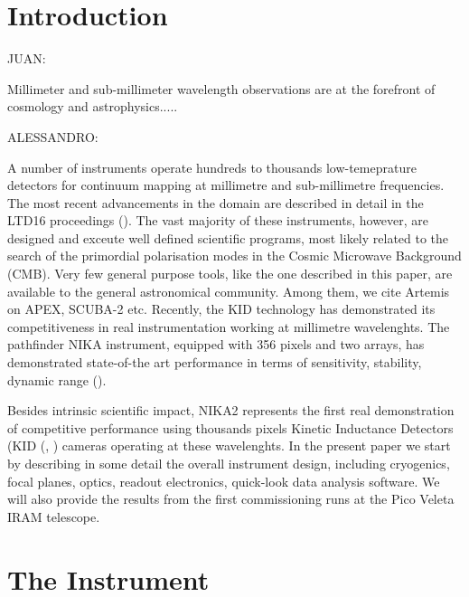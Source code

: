 \documentclass[]{aa} %
\begin{document}
   \maketitle
%

\section{Introduction}

JUAN:

Millimeter and sub-millimeter wavelength observations are at the forefront of cosmology and astrophysics.....  

ALESSANDRO: 

A number of instruments operate hundreds to thousands low-temeprature detectors for continuum mapping at millimetre and sub-millimetre frequencies. The most recent advancements in the domain are described in detail in the LTD16 proceedings (\cite{ltd16:2016}). The vast majority of these instruments, however, are designed and exceute well defined scientific programs, most likely related to the search of the primordial polarisation modes in the Cosmic Microwave Background (CMB). Very few general purpose tools, like the one described in this paper, are available to the general astronomical community. Among them, we cite Artemis on APEX, SCUBA-2 etc. Recently, the KID technology has demonstrated its competitiveness in real instrumentation working at millimetre wavelenghts. The pathfinder NIKA instrument, equipped with 356 pixels and two arrays, has demonstrated state-of-the art performance in terms of sensitivity, stability, dynamic range (\cite{Catalano2014, Monfardini2011, Adam2014}).

Besides intrinsic scientific impact, NIKA2 represents the first real demonstration of competitive performance using thousands pixels Kinetic Inductance Detectors (KID (\cite{Day2003}, \cite{Doyle2010}) cameras operating at these wavelenghts. In the present paper we start by describing in some detail the overall instrument design, including cryogenics, focal planes, optics, readout electronics, quick-look data analysis software. We will also provide the results from the first commissioning runs at the Pico Veleta IRAM telescope. 


\section{The Instrument}
\end{document}
